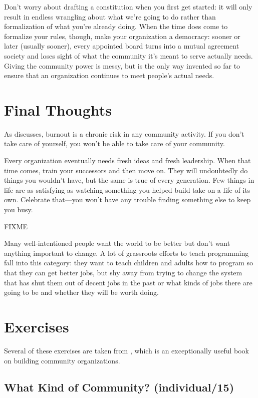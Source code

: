 Don't worry about drafting a constitution when you first get started: it
will only result in endless wrangling about what we're going to do
rather than formalization of what you're already doing. When the time
does come to formalize your rules, though, make your organization a
democracy: sooner or later (usually sooner), every appointed board turns
into a mutual agreement society and loses sight of what the community
it's meant to serve actually needs. Giving the community power is
messy, but is the only way invented so far to ensure that an
organization continues to meet people's actual needs.

\section{Final Thoughts}\label{s:community-final}

As \cite{Pign2016} discusses, burnout is a chronic risk in any
community activity. If you don't take care of yourself, you won't be
able to take care of your community.

Every organization eventually needs fresh ideas and fresh leadership.
When that time comes, train your successors and then move on. They will
undoubtedly do things you wouldn't have, but the same is true of every
generation. Few things in life are as satisfying as watching something
you helped build take on a life of its own. Celebrate that---you won't
have any trouble finding something else to keep you busy.

FIXME

Many well-intentioned people want the world to be better
but don't want anything important to change.
A lot of grassroots efforts to teach programming fall into this category:
they want to teach children and adults how to program so that they can get better jobs,
but shy away from trying to change the system
that has shut them out of decent jobs in the past
or 
what kinds of jobs there are going to be and whether they will be worth doing.

\section{Exercises}\label{s:community-exercises}

Several of these exercises are taken from \cite{Brow2007}, which is
an exceptionally useful book on building community organizations.

\subsection*{What Kind of Community? (individual/15)}

